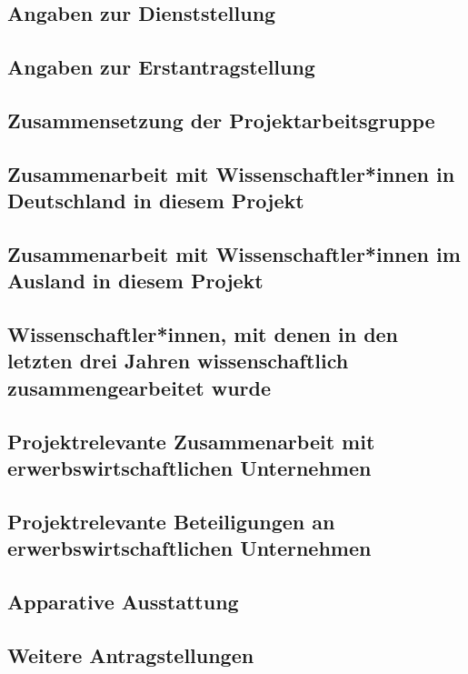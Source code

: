 \documentclass{scrartcl}
\begin{document}
\subsection{Angaben zur Dienststellung}

\subsection{Angaben zur Erstantragstellung}

\subsection{Zusammensetzung der Projektarbeitsgruppe}

\subsection{Zusammenarbeit mit Wissenschaftler*innen in Deutschland in diesem Projekt}

\subsection{Zusammenarbeit mit Wissenschaftler*innen im Ausland in diesem Projekt}

\subsection{Wissenschaftler*innen, mit denen in den letzten drei Jahren wissenschaftlich zusammengearbeitet wurde}

\subsection{Projektrelevante Zusammenarbeit mit erwerbswirtschaftlichen Unternehmen}

\subsection{Projektrelevante Beteiligungen an erwerbswirtschaftlichen Unternehmen}

\subsection{Apparative Ausstattung}

\subsection{Weitere Antragstellungen}
\end{document}

